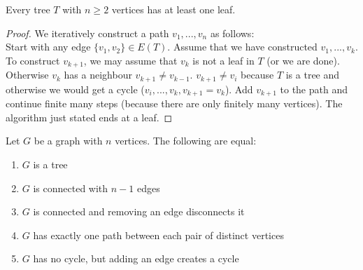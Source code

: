 \vspace{0.5cm}

\begin{lemma}\label{2.3}
    Every tree $T$ with $n\geq 2$ vertices has at least one leaf.
\end{lemma}
\begin{proof}
    We iteratively construct a path $v_1,...,v_n$ as follows:\\
    Start with any edge $\{v_1,v_2\}\in E(T)$. Assume that we have constructed $v_1,...,v_k$. To construct $v_{k+1}$, we may assume that $v_k$ is not a leaf in $T$ (or we are done). Otherwise $v_k$ has a neighbour $v_{k+1}\neq v_{k-1}$. $v_{k+1}\neq v_i$ because $T$ is a tree and otherwise we would get a cycle ($v_i,...,v_k,v_{k+1}=v_k$). Add $v_{k+1}$ to the path and continue finite many steps (because there are only finitely many vertices). The algorithm just stated ends at a leaf.
\end{proof}
\begin{theorem}\label{2.4}
    Let $G$ be a graph with $n$ vertices. The following are equal:
    \begin{enumerate}
        \item $G$ is a tree
        \item $G$ is connected with $n-1$ edges
        \item $G$ is connected and removing an edge disconnects it
        \item $G$ has exactly one path between each pair of distinct vertices
        \item $G$ has no cycle, but adding an edge creates a cycle
    \end{enumerate}
\end{theorem}
